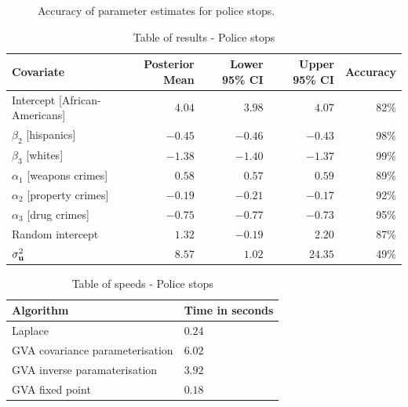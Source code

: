 \begin{figure}
\centering
{}
\caption{Accuracy of parameter estimates for police stops.}
\label{fig:police_stops}
\end{figure}

\begin{table}
	\begin{tabular}{|l|rrrr|}
		\hline
		Covariate                     & Posterior Mean & Lower 95\% CI & Upper 95\% CI & Accuracy \\
		\hline
		Intercept [African-Americans] & $4.04$          & $3.98$           & $4.07$          & 82\%   \\
		$\beta_2$ [hispanics]         & $-0.45$         & $-0.46$          & $-0.43$         & 98\%   \\
		$\beta_3$ [whites]            & $-1.38$         & $-1.40$          & $-1.37$         & 99\%   \\
		$\alpha_1$ [weapons crimes]   & $0.58$          & $0.57$           & $0.59$          & 89\%   \\
		$\alpha_2$ [property crimes]  & $-0.19$         & $-0.21$          & $-0.17$         & 92\%   \\
		$\alpha_3$ [drug crimes]      & $-0.75$        & $-0.77$          & $-0.73$         & 95\%   \\
		Random intercept              & $1.32$         & $-0.19$         & $2.20$         & 87\%   \\
		$\sigma^2_{{\bf u}}$              & $8.57$          & $1.02$           & $24.35$         & 49\%     \\
		\hline
	\end{tabular}
	\caption{Table of results - Police stops}
	\label{tab:application_police_stops}
\end{table}

\begin{table}
	\begin{tabular}{|ll|}
		\hline
		Algorithm & Time  in seconds \\
		\hline
		Laplace & $0.24$ \\
		GVA covariance parameterisation & $6.02$ \\
		GVA inverse paramaterisation & $3.92$ \\
		GVA fixed point & $0.18$ \\
		\hline
	\end{tabular}
	\caption{Table of speeds - Police stops}
	\label{tab:police_stop_speeds}
\end{table}

